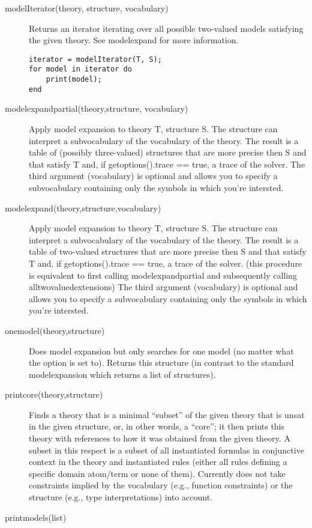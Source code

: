 \begin{description}
	\item[modelIterator(theory, structure, vocabulary)]
			Returns an iterator iterating over all possible two-valued models satisfying the given theory. See modelexpand for more information.
\begin{lstlisting}
iterator = modelIterator(T, S);
for model in iterator do
	print(model);
end
\end{lstlisting}
	\item[modelexpandpartial(theory,structure, vocabulary)]
		Apply model expansion to theory T, structure S. The structure can interpret a subvocabulary of the vocabulary of the theory.
 		The result is a table of (possibly three-valued) structures that are more precise then S and that satisfy T  and, if getoptions().trace == true, a trace of the solver.
		The third argument (vocabulary) is optional and allows you to specify a subvocabulary containing only the symbols in which you're intersted.
	\item[modelexpand(theory,structure,vocabulary)]
 		Apply model expansion to theory T, structure S. The structure can interpret a subvocabulary of the vocabulary of the theory.
 		The result is a table of two-valued structures that are more precise then S and that satisfy T and, if getoptions().trace == true, a trace of the solver.
		(this procedure is equivalent to first calling modelexpandpartial and subsequently calling alltwovaluedextensions) 
		The third argument (vocabulary) is optional and allows you to specify a subvocabulary containing only the symbols in which you're intersted.
	\item[onemodel(theory,structure)]
		Does model expansion but only searches for one model (no matter what the  option is set to). Returns this structure (in contrast to the standard modelexpansion which returns a list of structures).
	\item[printcore(theory,structure)]
		Finds a theory that is a minimal ``subset'' of the given theory that is unsat in the given structure, or, in other words, a ``core''; it then prints this theory with 
		references to how it was obtained from the given theory.
		A subset in this respect is a subset of all instantiated formulas in conjunctive context in the theory and instantiated rules 
		(either all rules defining a specific domain atom/term or none of them).
		Currently does not take constraints implied by the vocabulary (e.g., function constraints) or the structure (e.g., type interpretations) into account.
	\item[printmodels(list)]

\end{description}
